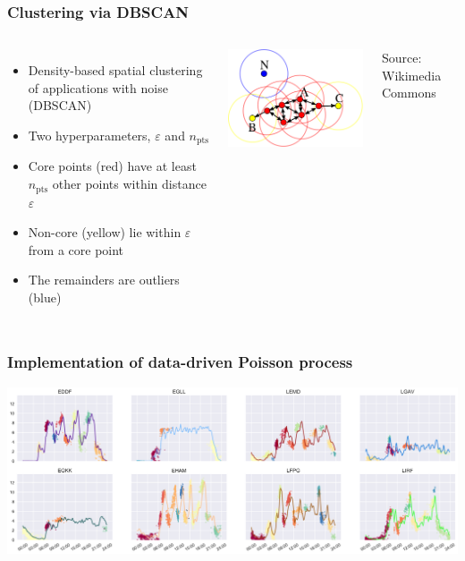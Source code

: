 \documentclass[table,aspectratio=169]{beamer}
\begin{document}
\begin{frame}[t]\frametitle{Clustering via DBSCAN}
    \begin{columns}
        \begin{itemize}
            \item Density-based spatial clustering of applications with noise (DBSCAN)
            \item Two hyperparameters, $\varepsilon$ and $n_{\mathrm{pts}}$
            \item Core points (red) have at least $n_{\mathrm{pts}}$ other points within distance $\varepsilon$
            \item Non-core (yellow) lie within $\varepsilon$ from a core point
            \item The remainders are outliers (blue)
        \end{itemize}

        \centering
        \includegraphics[width=.85\textwidth]{dbscan}

        {\tiny Source: Wikimedia Commons}
    \end{columns}
\end{frame}

\begin{frame}[t]\frametitle{Implementation of data-driven Poisson process}
    \centering
    \includegraphics[width=\textwidth]{DDPoisson}
\end{frame}
\end{document}
